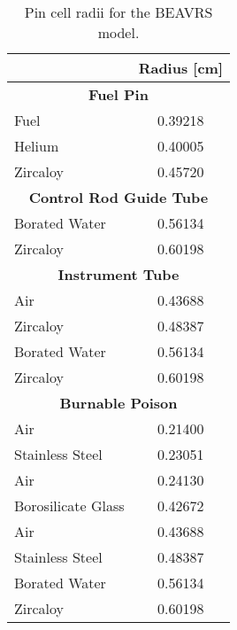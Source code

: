 \begin{appendices}
\renewcommand{\arraystretch}{0.9}
\begin{table}[h!]
  \centering
  \caption[BEAVRS pin cell radii]{Pin cell radii for the \ac{BEAVRS} model.}
  \small
  \label{table:app-pin-cell-radii} 
  \vspace{6pt}
  \begin{tabular}{l c}
  \toprule
  \rowcolor{lightgray}
  \multicolumn{1}{c}{\bf Material} &
  \multicolumn{1}{c}{\bf Radius [cm]} \\
  \midrule
  \multicolumn{2}{c}{\bf Fuel Pin} \\
  \midrule
  Fuel &  0.39218 \\
  Helium & 0.40005 \\
  Zircaloy & 0.45720 \\
  \midrule
  \multicolumn{2}{c}{\bf Control Rod Guide Tube} \\
  \midrule
  Borated Water & 0.56134 \\
  Zircaloy & 0.60198 \\
  \midrule
  \multicolumn{2}{c}{\bf Instrument Tube} \\
  \midrule
  Air & 0.43688 \\
  Zircaloy & 0.48387 \\
  Borated Water & 0.56134 \\
  Zircaloy & 0.60198 \\
  \midrule
  \multicolumn{2}{c}{\bf Burnable Poison} \\
  \midrule
  Air & 0.21400 \\
  Stainless Steel & 0.23051 \\
  Air & 0.24130 \\
  Borosilicate Glass & 0.42672 \\
  Air & 0.43688 \\
  Stainless Steel & 0.48387 \\
  Borated Water & 0.56134 \\
  Zircaloy & 0.60198 \\
  \bottomrule
\end{tabular}
\end{table}



\end{appendices}
